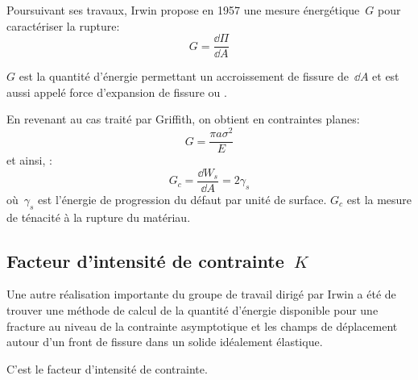 \medskip
Poursuivant ses travaux, Irwin propose en 1957
une mesure énergétique~$G$ pour caractériser la rupture:
\begin{equation} G = \dfrac{\dd\Pi}{\dd A} \end{equation}

$G$ est la quantité d'énergie permettant un accroissement de fissure de~$\dd A$ et est aussi appelé
force d'expansion de fissure ou .

\medskip
En revenant au cas traité par Griffith, on obtient
en contraintes planes:
\begin{equation} G = \dfrac{\pi a\sigma^2}{E} \end{equation}
et ainsi, :
\begin{equation} G_c = \dfrac{\dd W_s}{\dd A}=2\gamma_s \end{equation}
où~$\gamma_s$ est l'énergie de progression du défaut par unité de surface.
$G_c$ est la mesure de ténacité à la rupture du matériau.


\medskip
\subsection{Facteur d'intensité de contrainte~$K$}

\medskip
\begin{histoire}%
Une autre réalisation importante du groupe de travail dirigé par Irwin a été de trouver une méthode
de calcul de la quantité d'énergie disponible pour une fracture au niveau de la contrainte asymptotique
et les champs de déplacement autour d'un front de fissure dans un solide idéalement élastique.

C'est le facteur d'intensité de contrainte.
\end{histoire}

